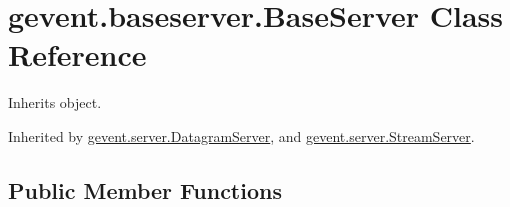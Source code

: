 \hypertarget{classgevent_1_1baseserver_1_1_base_server}{}\section{gevent.\+baseserver.\+Base\+Server Class Reference}
\label{classgevent_1_1baseserver_1_1_base_server}


Inherits object.



Inherited by \hyperlink{classgevent_1_1server_1_1_datagram_server}{gevent.\+server.\+Datagram\+Server}, and \hyperlink{classgevent_1_1server_1_1_stream_server}{gevent.\+server.\+Stream\+Server}.

\subsection*{Public Member Functions}
